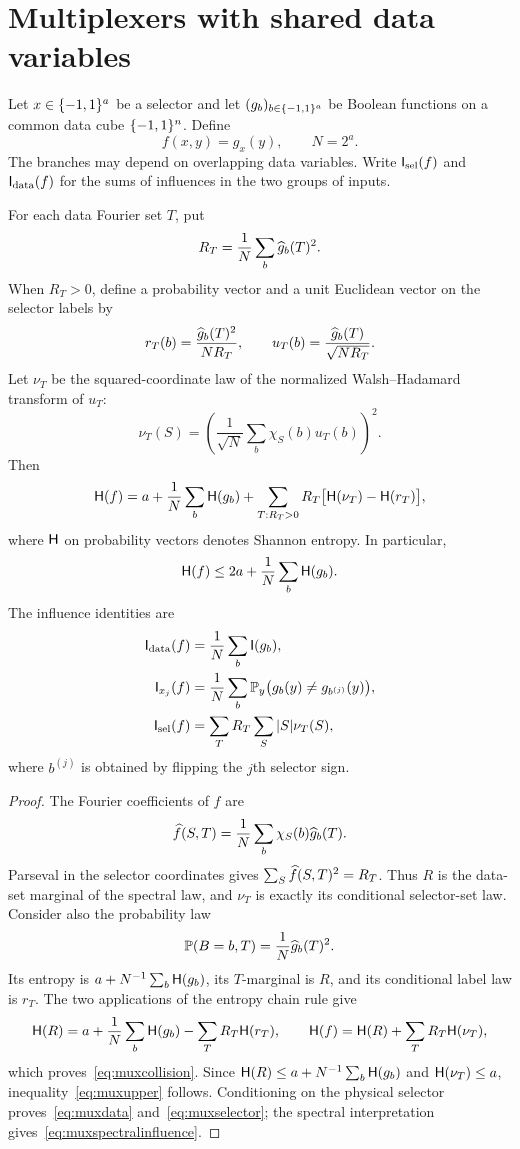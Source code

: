 \section{Multiplexers with shared data variables}\label{sec:multiplexers}

Let $x\in\{-1,1\}^a$ be a selector and let $(g_b)_{b\in\{-1,1\}^a}$ be Boolean functions on a common data cube $\{-1,1\}^n$. Define
\[
 f(x,y)=g_x(y),\qquad N=2^a.
\]
The branches may depend on overlapping data variables. Write $\mathsf I_{\rm sel}(f)$ and $\mathsf I_{\rm data}(f)$ for the sums of influences in the two groups of inputs.

\begin{proposition}\label{prop:muxcollision}
For each data Fourier set $T$, put
\[
 R_T=\frac1N\sum_b\widehat{g}_b(T)^2.
\]
When $R_T>0$, define a probability vector and a unit Euclidean vector on the selector labels by
\[
 r_T(b)=\frac{\widehat{g}_b(T)^2}{NR_T},\qquad
 u_T(b)=\frac{\widehat{g}_b(T)}{\sqrt{NR_T}}.
\]
Let $\nu_T$ be the squared-coordinate law of the normalized Walsh--Hadamard transform of $u_T$:
\[
 \nu_T(S)=\left(\frac1{\sqrt N}\sum_b\chi_S(b)u_T(b)\right)^2.
\]
Then
\begin{equation}\label{eq:muxcollision}
 \mathsf H(f)=a+\frac1N\sum_b\mathsf H(g_b)
 +\sum_{T:R_T>0}R_T\bigl[\mathsf H(\nu_T)-\mathsf H(r_T)\bigr],
\end{equation}
where $\mathsf H$ on probability vectors denotes Shannon entropy. In particular,
\begin{equation}\label{eq:muxupper}
 \mathsf H(f)\le2a+\frac1N\sum_b\mathsf H(g_b).
\end{equation}
The influence identities are
\begin{align}
 \mathsf I_{\rm data}(f)&=\frac1N\sum_b\mathsf I(g_b),\label{eq:muxdata}\\
 \mathsf I_{x_j}(f)&=\frac1N\sum_b\mathbb P_y\bigl(g_b(y)\ne g_{b^{(j)}}(y)\bigr),\label{eq:muxselector}\\
 \mathsf I_{\rm sel}(f)&=\sum_T R_T\sum_S|S|\nu_T(S),\label{eq:muxspectralinfluence}
\end{align}
where $b^{(j)}$ is obtained by flipping the $j$th selector sign.
\end{proposition}
\begin{proof}
The Fourier coefficients of $f$ are
\[
 \widehat{f}(S,T)=\frac1N\sum_b\chi_S(b)\widehat{g}_b(T).
\]
Parseval in the selector coordinates gives $\sum_S\widehat{f}(S,T)^2=R_T$. Thus $R$ is the data-set marginal of the spectral law, and $\nu_T$ is exactly its conditional selector-set law. Consider also the probability law
\[
 \mathbb P(B=b,T)=\frac1N\widehat{g}_b(T)^2.
\]
Its entropy is $a+N^{-1}\sum_b\mathsf H(g_b)$, its $T$-marginal is $R$, and its conditional label law is $r_T$. The two applications of the entropy chain rule give
\[
 \mathsf H(R)=a+\frac1N\sum_b\mathsf H(g_b)-\sum_T R_T\mathsf H(r_T),
 \qquad
 \mathsf H(f)=\mathsf H(R)+\sum_T R_T\mathsf H(\nu_T),
\]
which proves~\eqref{eq:muxcollision}. Since $\mathsf H(R)\le a+N^{-1}\sum_b\mathsf H(g_b)$ and $\mathsf H(\nu_T)\le a$, inequality~\eqref{eq:muxupper} follows. Conditioning on the physical selector proves~\eqref{eq:muxdata} and~\eqref{eq:muxselector}; the spectral interpretation gives~\eqref{eq:muxspectralinfluence}.
\end{proof}

